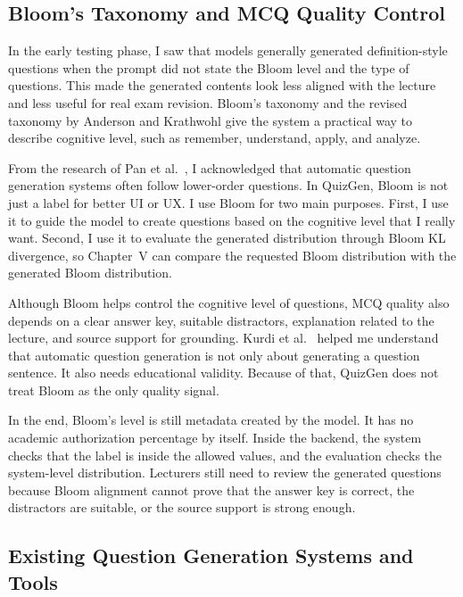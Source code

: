 \documentclass[12pt,a4paper]{article}
\begin{document}
\subsection{Bloom's Taxonomy and MCQ Quality Control}
\label{subsec:bloom}

In the early testing phase, I saw that models generally generated
definition-style questions when the prompt did not state the Bloom level and
the type of questions. This made the generated contents look less aligned
with the lecture and less useful for real exam revision. Bloom's taxonomy
\cite{bloom1956taxonomy} and the revised taxonomy by Anderson and Krathwohl
\cite{anderson2001taxonomy} give the system a practical way to describe
cognitive level, such as remember, understand, apply, and analyze.

From the research of Pan et al.\ \cite{pan2019nqg}, I acknowledged that
automatic question generation systems often follow lower-order questions. In
QuizGen, Bloom is not just a label for better UI or UX. I use Bloom for two
main purposes. First, I use it to guide the model to create questions based
on the cognitive level that I really want. Second, I use it to evaluate the
generated distribution through Bloom KL divergence, so Chapter~V can compare
the requested Bloom distribution with the generated Bloom distribution.

Although Bloom helps control the cognitive level of questions, MCQ quality
also depends on a clear answer key, suitable distractors, explanation related
to the lecture, and source support for grounding. Kurdi et al.\
\cite{kurdi2020aqg} helped me understand that automatic question generation
is not only about generating a question sentence. It also needs educational
validity. Because of that, QuizGen does not treat Bloom as the only quality
signal.

In the end, Bloom's level is still metadata created by the model. It has no
academic authorization percentage by itself. Inside the backend, the system
checks that the label is inside the allowed values, and the evaluation checks
the system-level distribution. Lecturers still need to review the generated
questions because Bloom alignment cannot prove that the answer key is
correct, the distractors are suitable, or the source support is strong
enough.

\subsection{Existing Question Generation Systems and Tools}
\end{document}
